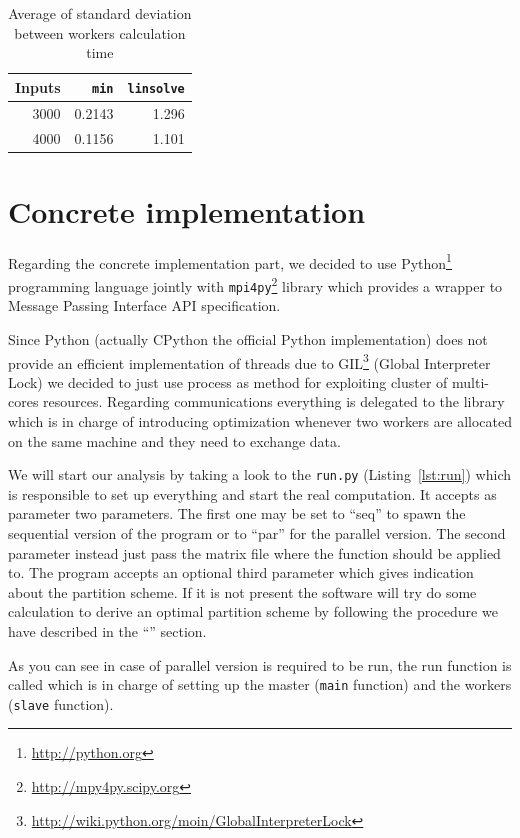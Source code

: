 \begin{table}
  \centering
  \begin{tabular}{|r|r|r|}
    \hline
    \textbf{Inputs} & \texttt{min} & \texttt{linsolve} \\
    \hline
    3000            & 0.2143       & 1.296 \\
    \hline
    4000            & 0.1156       & 1.101 \\
    \hline
  \end{tabular}
  \caption{Average of standard deviation between workers calculation
  time}
  \label{tbl:std-deviation}
\end{table}

\section{Concrete implementation}\label{sec:concrete-impl}

Regarding the concrete implementation part, we decided to use
Python\footnote{\url{http://python.org}} programming language jointly
with \texttt{mpi4py}\footnote{\url{http://mpy4py.scipy.org}} library
which provides a wrapper to Message Passing Interface API specification.

Since Python (actually CPython the official Python implementation) does
not provide an efficient implementation of threads due to
GIL\footnote{\url{http://wiki.python.org/moin/GlobalInterpreterLock}}
(Global Interpreter Lock) we decided to just use process as method for
exploiting cluster of multi-cores resources. Regarding communications
everything is delegated to the library which is in charge of introducing
optimization whenever two workers are allocated on the same machine and
they need to exchange data.

We will start our analysis by taking a look to the \texttt{run.py}
(Listing~\ref{lst:run}) which is responsible to set up everything and
start the real computation. It accepts as parameter two parameters. The
first one may be set to ``seq'' to spawn the sequential version of the
program or to ``par'' for the parallel version. The second parameter
instead just pass the matrix file where the function should be applied
to. The program accepts an optional third parameter which gives
indication about the partition scheme. If it is not present the software
will try do some calculation to derive an optimal partition scheme by
following the procedure we have described in the
``'' section.

As you can see in case of parallel version is required to be run, the
run function is called which is in charge of setting up the master
(\texttt{main} function) and the workers (\texttt{slave} function).

